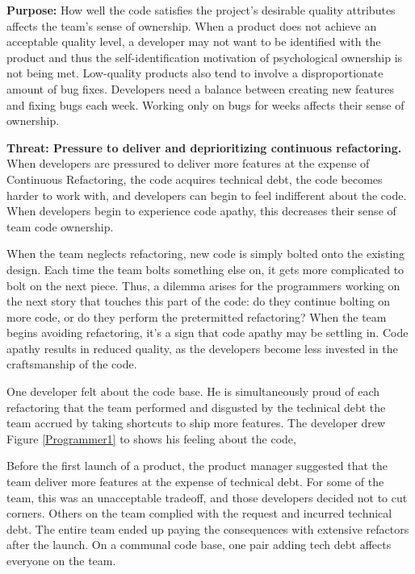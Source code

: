 \textbf{Purpose:} How well the code satisfies the project's desirable quality attributes affects the team's sense of ownership. When a product does not achieve an acceptable quality level, a developer may not want to be identified with the product and thus the self-identification motivation of psychological ownership is not being met. Low-quality products also tend to involve a disproportionate amount of bug fixes. Developers need a balance between creating new features and fixing bugs each week. Working only on bugs for weeks affects their sense of ownership.    

\textbf{Threat: Pressure to deliver and deprioritizing continuous refactoring.} When developers are pressured to deliver more features at the expense of Continuous Refactoring, the code acquires technical debt, the code becomes harder to work with, and developers can begin to feel indifferent about the code. When developers begin to experience code apathy, this decreases their sense of team code ownership. 

When the team neglects refactoring, new code is simply bolted onto the existing design. Each time the team bolts something else on, it gets more complicated to bolt on the next piece. Thus, a dilemma arises for the programmers working on the next story that touches this part of the code: do they continue bolting on more code, or do they perform the pretermitted refactoring? When the team begins avoiding refactoring, it's a sign that code apathy may be settling in. Code apathy results in reduced quality, as the developers become less invested in the craftsmanship of the code.

One developer felt  about the code base. He is simultaneously proud of each refactoring that the team performed and disgusted by the technical debt the team accrued by taking shortcuts to ship more features. The developer drew Figure \ref{Programmer1} to shows his feeling about the code, 

Before the first launch of a product, the product manager suggested that the team deliver more features at the expense of technical debt. For some of the team, this was an unacceptable tradeoff, and those developers decided not to cut corners. Others on the team complied with the request and incurred technical debt. The entire team ended up paying the consequences with extensive refactors after the launch. On a communal code base, one pair adding tech debt affects everyone on the team.

